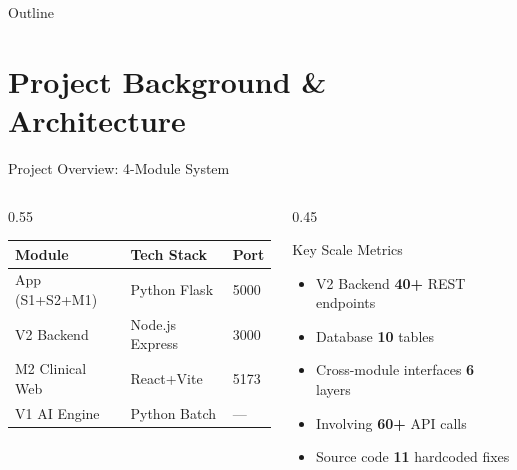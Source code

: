 \documentclass[aspectratio=169,utf8,11pt]{beamer}
\begin{document}
\begin{frame}{Outline}
  \tableofcontents[hideallsubsections]
\end{frame}

\section{Project Background \& Architecture}

\begin{frame}{Project Overview: 4-Module System}
  \begin{columns}[T]
    \begin{column}{0.55\textwidth}
      \begin{table}[h]
        \small
        \begin{tabular}{lll}
          \toprule
          \textbf{Module} & \textbf{Tech Stack} & \textbf{Port} \\
          \midrule
          App (S1+S2+M1) & Python Flask & 5000 \\
          V2 Backend & Node.js Express & 3000 \\
          M2 Clinical Web & React+Vite & 5173 \\
          V1 AI Engine & Python Batch & --- \\
          \bottomrule
        \end{tabular}
      \end{table}
    \end{column}
    \begin{column}{0.45\textwidth}
      \begin{block}{Key Scale Metrics}
        \begin{itemize}
          \item V2 Backend \textbf{40+} REST endpoints
          \item Database \textbf{10} tables
          \item Cross-module interfaces \textbf{6} layers
          \item Involving \textbf{60+} API calls
          \item Source code \textbf{11} hardcoded fixes
        \end{itemize}
      \end{block}
    \end{column}
  \end{columns}


\end{frame}
\end{document}
